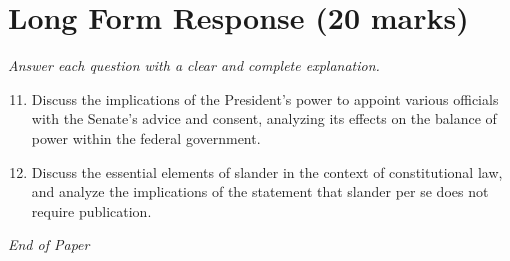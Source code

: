 \documentclass[12pt]{article}
\begin{document}
\section*{Long Form Response (20 marks)}
\textit{Answer each question with a clear and complete explanation.}
\begin{enumerate}[label=\arabic*.]
\setcounter{enumi}{10}
\item Discuss the implications of the President's power to appoint various officials with the Senate's advice and consent, analyzing its effects on the balance of power within the federal government.
\item Discuss the essential elements of slander in the context of constitutional law, and analyze the implications of the statement that slander per se does not require publication.
\end{enumerate}

\vfill
\noindent\textit{End of Paper}
\end{document}
